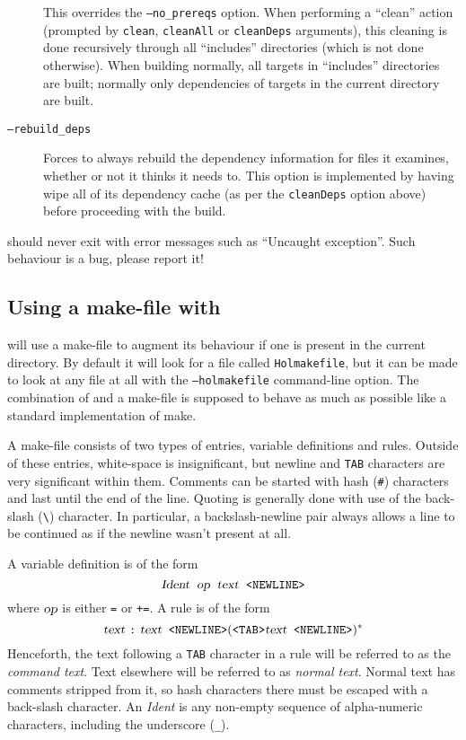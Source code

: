 \begin{description}
This overrides the \texttt{--no\_prereqs} option.
When performing a ``clean'' action (prompted by \texttt{clean}, \texttt{cleanAll} or \texttt{cleanDeps} arguments), this cleaning is done recursively through all ``includes'' directories (which is not done otherwise).
When building normally, all targets in ``includes'' directories are built; normally only dependencies of targets in the current directory are built.
\item[{\tt --rebuild\_deps}] Forces \holmake{} to always
  rebuild the dependency information for files it examines, whether or
  not it thinks it needs to.  This option is implemented by having
  \holmake{} wipe all of its dependency cache (as per the
  \texttt{cleanDeps} option above) before proceeding with the build.
\end{description}

\noindent \holmake{} should never exit with error messages such as ``Uncaught
exception''.  Such behaviour is a bug, please report it!


\subsection{Using a make-file with \holmake}
\label{sec:using-Holmakefiles}

\holmake{} will use a make-file to augment its behaviour if one is
present in the current directory.  By default it will look for a file
called \texttt{Holmakefile}, but it can be made to look at any file at
all with the \texttt{--holmakefile} command-line option.  The
combination of \holmake{} and a make-file is supposed to behave as
much as possible like a standard implementation of \textsf{make}.

A make-file consists of two types of entries, variable definitions and
rules.  Outside of these entries, white-space is insignificant, but
newline and \texttt{TAB} characters are very significant within them.
Comments can be started with hash (\texttt{\#}) characters and last
until the end of the line.  Quoting is generally done with use of the
back-slash (\verb+\+) character.  In particular, a backslash-newline
pair always allows a line to be continued as if the newline wasn't
present at all.

A variable definition is of the form
\[
\textsl{Ident} \;\;\textsl{op}\;\; \textsl{text}\;\;  \texttt{<NEWLINE>}
\]
where $\textsl{op}$ is either \texttt{=} or \texttt{+=}.
A rule is of the form
\[
\textsl{text } \texttt{:} \textsl{ text} \texttt{ <NEWLINE>}
(\texttt{<TAB>}\textsl{text}\texttt{ <NEWLINE>})^*
\]
Henceforth, the text following a \texttt{TAB} character in a rule will
be referred to as the \emph{command text}.  Text elsewhere will be
referred to as \emph{normal text}.  Normal text has comments stripped
from it, so hash characters there must be escaped with a back-slash
character.  An \textsl{Ident} is any non-empty sequence of
alpha-numeric characters, including the underscore (\texttt{\_}).

